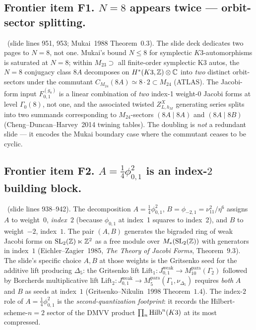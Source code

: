 \subsection*{Frontier item F1. $N=8$ appears twice --- orbit-sector splitting.}
\ClaimStatusTheorem\ (slide lines 951, 953; Mukai~1988 Theorem~0.3).
The slide deck dedicates two pages to $N=8$, not one. Mukai's bound
$N\leq 8$ for symplectic $K3$-automorphisms is saturated at $N=8$;
within $M_{23}\supset$ all finite-order symplectic K3 autos, the
$N=8$ conjugacy class $8A$ decomposes on $H^*(K3,\mathbb{Z})\otimes\mathbb{C}$ into
\emph{two} distinct orbit-sectors under the commutant
$C_{M_{24}}(8A)\simeq 8\cdot 2 \subset M_{24}$ (ATLAS). The Jacobi-form
input $F^{(g_8)}_{0,1}$ is a linear combination of \emph{two} index-1
weight-0 Jacobi forms at level $\Gamma_0(8)$, not one, and the
associated twisted $Z^X_{L, h_M}$ generating series splits into two
summands corresponding to $M_{24}$-sectors $(8A\mid 8A)$ and
$(8A\mid 8B)$ (Cheng--Duncan--Harvey~2014 twining tables). The
doubling is \emph{not} a redundant slide --- it encodes the Mukai
boundary case where the commutant ceases to be cyclic.

\subsection*{Frontier item F2. $A=\tfrac14\phi_{0,1}^2$ is an index-$2$ building block.}
\ClaimStatusTheorem\ (slide lines 938--942).
The decomposition $A=\tfrac14\phi_{0,1}^2$, $B=\phi_{-2,1}
=\nu_{11}^2/\eta^6$ assigns $A$ to weight~$0$, \emph{index~$2$}
(because $\phi_{0,1}$ at index~1 squares to index~2), and $B$ to
weight~$-2$, index~$1$. The pair $(A, B)$ generates the bigraded ring
of weak Jacobi forms on $\mathrm{SL}_2(\mathbb{Z})\ltimes\mathbb{Z}^2$ as a free
module over $M_*(\mathrm{SL}_2(\mathbb{Z}))$ with generators in index~$1$
(Eichler--Zagier~1985, \emph{The Theory of Jacobi Forms},
Theorem~$9.3$). The slide's specific choice $A,B$ at those weights is
the Gritsenko seed for the additive lift producing $\Delta_5$: the
Gritsenko lift $\mathrm{Lift}_1\colon J^{\mathrm{weak}}_{0,1}\to
M^{\mathrm{para}}_{10}(\Gamma_2)$ followed by Borcherds multiplicative
lift $\mathrm{Lift}_2\colon J^{\mathrm{weak}}_{0,1}\to
M^{\mathrm{para}}_{5}(\Gamma_1,\nu_{\Delta_5})$ requires \emph{both}
$A$ and $B$ as seeds at index~$1$ (Gritsenko--Nikulin~1998
Theorem~$1.4$). The index-$2$ role of $A=\tfrac14\phi_{0,1}^2$ is the
\emph{second-quantization footprint}: it records the
Hilbert-scheme-$n=2$ sector of the DMVV product
$\prod_{n}\mathrm{Hilb}^n(K3)$ at its most compressed.

